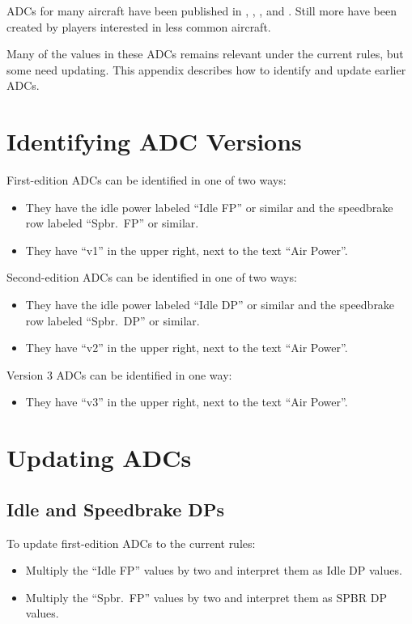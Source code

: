 
ADCs for many aircraft have been published in {\AirSup}, {\AirStr}, {\TSOH}, and {\APJ}. Still more have been created by players interested in less common aircraft. 

Many of the values in these ADCs remains relevant under the current rules, but some need updating. This appendix describes how to identify and update earlier ADCs.


\section{Identifying ADC Versions}

First-edition ADCs can be identified in one of two ways:
\begin{itemize} 
\item They have the idle power labeled “Idle FP” or similar and the speedbrake row labeled “Spbr.\ FP” or similar. 
\item They have “v1” in the upper right, next to the text “Air Power”.
\end{itemize}

Second-edition ADCs can be identified in one of two ways:
\begin{itemize} 
\item They have the idle power labeled “Idle DP” or similar and the speedbrake row labeled “Spbr.\ DP” or similar. 
\item They have “v2” in the upper right, next to the text “Air Power”.
\end{itemize}

Version 3 ADCs can be identified in one way:
\begin{itemize}
\item They have “v3” in the upper right, next to the text “Air Power”.
\end{itemize}

\section{Updating ADCs}

\subsection{Idle and Speedbrake DPs}

To update first-edition ADCs to the current rules:

\begin{itemize}

\item Multiply the “Idle FP” values by two and interpret them as Idle DP values.
\item Multiply the “Spbr.\ FP” values by two and interpret them as SPBR DP values.

\end{itemize}

